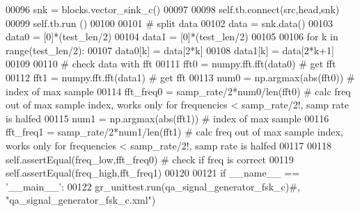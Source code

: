 \begin{DoxyCode}
00096         snk = blocks.vector\_sink\_c()
00097         
00098         self.tb.connect(src,head,snk)
00099         self.tb.run ()
00100         
00101         \textcolor{comment}{# split data}
00102         data = snk.data()
00103         data0 = [0]*(test\_len/2)
00104         data1 = [0]*(test\_len/2)
00105         
00106         \textcolor{keywordflow}{for} k \textcolor{keywordflow}{in} range(test\_len/2):
00107             data0[k] = data[2*k]
00108             data1[k] = data[2*k+1]
00109         
00110         \textcolor{comment}{# check data with fft}
00111         fft0 = numpy.fft.fft(data0) \textcolor{comment}{# get fft}
00112         fft1 = numpy.fft.fft(data1) \textcolor{comment}{# get fft}
00113         num0 = np.argmax(abs(fft0)) \textcolor{comment}{# index of max sample}
00114         fft\_freq0 = samp\_rate/2*num0/len(fft0) \textcolor{comment}{# calc freq out of max sample index, works only for
       frequencies < samp\_rate/2!, samp rate is halfed}
00115         num1 = np.argmax(abs(fft1)) \textcolor{comment}{# index of max sample}
00116         fft\_freq1 = samp\_rate/2*num1/len(fft1) \textcolor{comment}{# calc freq out of max sample index, works only for
       frequencies < samp\_rate/2!, samp rate is halfed}
00117         
00118         self.assertEqual(freq\_low,fft\_freq0) \textcolor{comment}{# check if freq is correct}
00119         self.assertEqual(freq\_high,fft\_freq1)
00120 
00121 \textcolor{keywordflow}{if} \_\_name\_\_ == \textcolor{stringliteral}{'\_\_main\_\_'}:
00122     gr\_unittest.run(qa\_signal\_generator\_fsk\_c)\textcolor{comment}{#, "qa\_signal\_generator\_fsk\_c.xml")}
\end{DoxyCode}
